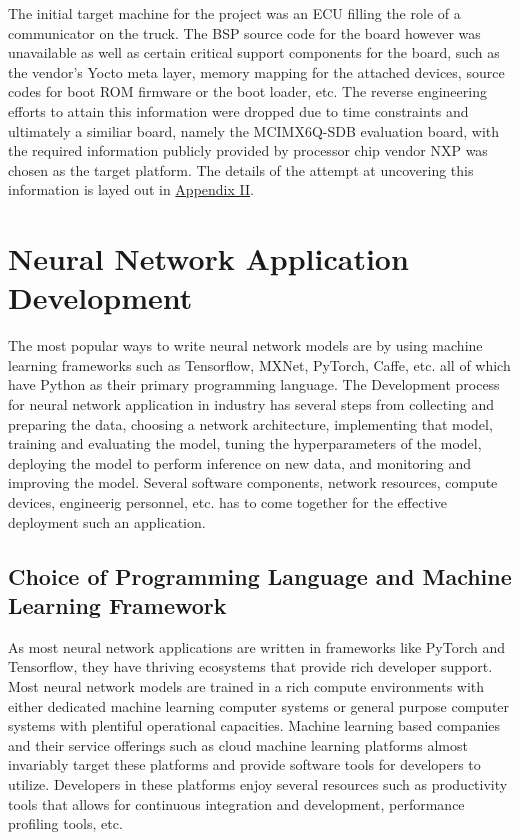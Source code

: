 The initial target machine for the project was an ECU filling the role of a communicator on the truck. The BSP source code for the board however was unavailable as well as certain critical support components for the board, such as the vendor's Yocto meta layer, memory mapping for the attached devices, source codes for boot ROM firmware or the boot loader, etc. The reverse engineering efforts to attain this information were dropped due to time constraints and ultimately a similiar board, namely the MCIMX6Q-SDB evaluation board, with the required information publicly provided by processor chip vendor NXP was chosen as the target platform. The details of the attempt at uncovering this information is layed out in \hyperref[rtc-c300]{Appendix II}.

\section{Neural Network Application Development}

The most popular ways to write neural network models are by using machine learning frameworks such as Tensorflow, MXNet, PyTorch, Caffe, etc. all of which have Python as their primary programming language. The Development process for neural network application in industry has several steps from collecting and preparing the data, choosing a network architecture, implementing that model, training and evaluating the model, tuning the hyperparameters of the model, deploying the model to perform inference on new data, and monitoring and improving the model. Several software components, network resources, compute devices, engineerig personnel, etc. has to come together for the effective deployment such an application.

\subsection{Choice of Programming Language and Machine Learning Framework}

As most neural network applications are written in frameworks like PyTorch and Tensorflow, they have thriving ecosystems that provide rich developer support. Most neural network models are trained in a rich compute environments with either dedicated machine learning computer systems or general purpose computer systems with plentiful operational capacities. Machine learning based companies and their service offerings such as cloud machine learning platforms almost invariably target these platforms and provide software tools for developers to utilize. Developers in these platforms enjoy several resources such as productivity tools that allows for continuous integration and development, performance profiling tools, etc.

